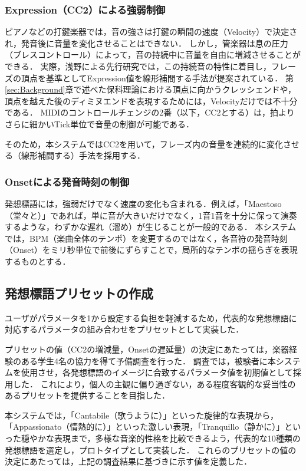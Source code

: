 \subsubsection{Expression（CC2）による強弱制御}
ピアノなどの打鍵楽器では，音の強さは打鍵の瞬間の速度（Velocity）で決定され，発音後に音量を変化させることはできない．
しかし，管楽器は息の圧力（ブレスコントロール）によって，音の持続中に音量を自由に増減させることができる．
実際，浅野による先行研究では，この持続音の特性に着目し，フレーズの頂点を基準としてExpression値を線形補間する手法が提案されている\cite{LongTone}．
第\ref{sec:Background}章で述べた保科理論における頂点に向かうクレッシェンドや，頂点を越えた後のディミヌエンドを表現するためには，Velocityだけでは不十分である．
MIDIのコントロールチェンジの2番（以下，CC2とする）は，拍よりさらに細かいTick単位で音量の制御が可能である．

そのため，本システムではCC2を用いて，フレーズ内の音量を連続的に変化させる（線形補間する）手法を採用する．


\subsubsection{Onsetによる発音時刻の制御}
発想標語には，強弱だけでなく速度の変化も含まれる．例えば，「Maestoso（堂々と）」であれば，単に音が大きいだけでなく，1音1音を十分に保って演奏するような，わずかな遅れ（溜め）が生じることが一般的である．
本システムでは，BPM（楽曲全体のテンポ）を変更するのではなく，各音符の発音時刻（Onset）をミリ秒単位で前後にずらすことで，局所的なテンポの揺らぎを表現するものとする．

\subsection{発想標語プリセットの作成}
ユーザがパラメータを1から設定する負担を軽減するため，代表的な発想標語に対応するパラメータの組み合わせをプリセットとして実装した．

プリセットの値（CC2の増減量，Onsetの遅延量）の決定にあたっては，楽器経験のある学生4名の協力を得て予備調査を行った．
調査では，被験者に本システムを使用させ，各発想標語のイメージに合致するパラメータ値を初期値として採用した．
これにより，個人の主観に偏り過ぎない，ある程度客観的な妥当性のあるプリセットを提供することを目指した．

本システムでは，「Cantabile（歌うように）」といった旋律的な表現から，「Appassionato（情熱的に）」といった激しい表現，「Tranquillo（静かに）」といった穏やかな表現まで，多様な音楽的性格を比較できるよう，代表的な10種類の発想標語を選定し，プロトタイプとして実装した．
これらのプリセットの値の決定にあたっては，上記の調査結果に基づきに示す値を定義した．

